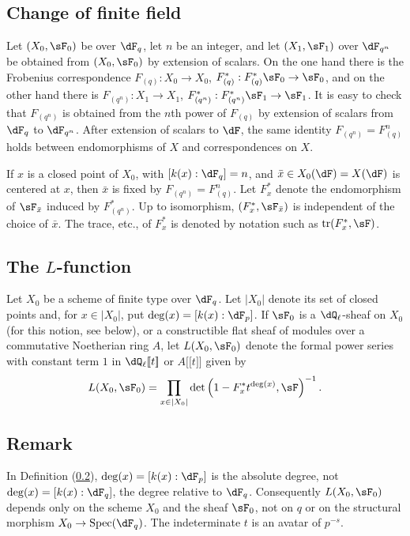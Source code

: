 \documentclass[12pt,oneside,english]{smfbook}
\DeclareMathOperator{\spec}{Spec}
\DeclareMathOperator{\tr}{tr}
\providecommand{\llbracket}{\mathopen{[\![}}
\providecommand{\rrbracket}{\mathclose{]\!]}}
\begin{document}
\subsection{Change of finite field}\label{II:1-5}

Let $(X_0,\sF_0)$ be over $\dF_q$, let $n$ be an integer, and let $(X_1,\sF_1)$ over $\dF_{q^n}$ be obtained from $(X_0,\sF_0)$ by extension of scalars. On the one hand there is the Frobenius correspondence $F_{(q)}:X_0\to X_0$, $F_{(q)}^*:F_{(q)}^*\sF_0\to\sF_0$, and on the other hand there is $F_{(q^n)}:X_1\to X_1$, $F_{(q^n)}^*:F_{(q^n)}^*\sF_1\to\sF_1$. It is easy to check that $F_{(q^n)}$ is obtained from the $n$th power of $F_{(q)}$ by extension of scalars from $\dF_q$ to $\dF_{q^n}$. After extension of scalars to $\dF$, the same identity $F_{(q^n)}=F_{(q)}^n$ holds between endomorphisms of $X$ and correspondences on $X$.

If $x$ is a closed point of $X_0$, with $[k(x):\dF_q]=n$, and $\bar x\in X_0(\dF)=X(\dF)$ is centered at $x$, then $\bar x$ is fixed by $F_{(q^n)}=F_{(q)}^n$. Let $F_x^*$ denote the endomorphism of $\sF_{\bar x}$ induced by $F_{(q^n)}^*$. Up to isomorphism, $(F_x^*,\sF_{\bar x})$ is independent of the choice of $\bar x$. The trace, etc., of $F_x^*$ is denoted by notation such as $\tr(F_x^*,\sF)$.

\subsection{The \texorpdfstring{$L$}{L}-function}\label{II:1-6}

Let $X_0$ be a scheme of finite type over $\dF_q$. Let $|X_0|$ denote its set of closed points and, for $x\in|X_0|$, put $\deg(x)=[k(x):\dF_p]$. If $\sF_0$ is a $\dQ_\ell$-sheaf on $X_0$ (for this notion, see below), or a constructible flat sheaf of modules over a commutative Noetherian ring $A$, let $L(X_0,\sF_0)$ denote the formal power series with constant term $1$ in $\dQ_\ell\llbracket t\rrbracket$ or $A\llbracket t\rrbracket$ given by
\[
  L(X_0,\sF_0) = \prod_{x\in|X_0|} \det\left(1-F_x^* t^{\deg(x)},\sF\right)^{-1} \text{.}
\]

\subsection{Remark}\label{II:1-7}

In Definition (\ref{II:1-6}), $\deg(x)=[k(x):\dF_p]$ is the absolute degree, not $\deg(x)=[k(x):\dF_q]$, the degree relative to $\dF_q$. Consequently $L(X_0,\sF_0)$ depends only on the scheme $X_0$ and the sheaf $\sF_0$, not on $q$ or on the structural morphism $X_0\to\spec(\dF_q)$. The indeterminate $t$ is an avatar of $p^{-s}$.
\end{document}
